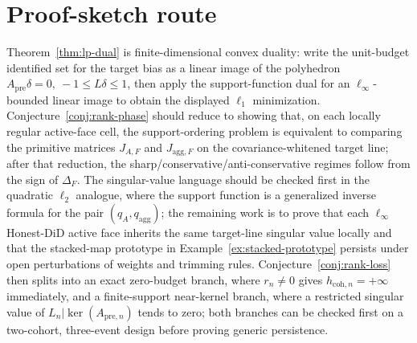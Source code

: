 \documentclass[11pt]{article}
\theoremstyle{definition}
\theoremstyle{plain}
\theoremstyle{remark}
\begin{document}
\section{Proof-sketch route}
Theorem~\ref{thm:lp-dual} is finite-dimensional convex duality: write the unit-budget identified set for the target bias as a linear image of the polyhedron \(A_{\mathrm{pre}}\delta=0,\ -1\le L\delta\le1\), then apply the support-function dual for an \(\ell_\infty\)-bounded linear image to obtain the displayed \(\ell_1\) minimization.
Conjecture~\ref{conj:rank-phase} should reduce to showing that, on each locally regular active-face cell, the support-ordering problem is equivalent to comparing the primitive matrices \(J_{A,F}\) and \(J_{\mathrm{agg},F}\) on the covariance-whitened target line; after that reduction, the sharp/conservative/anti-conservative regimes follow from the sign of \(\Delta_F\).
The singular-value language should be checked first in the quadratic \(\ell_2\) analogue, where the support function is a generalized inverse formula for the pair \((q_A,q_{\mathrm{agg}})\); the remaining work is to prove that each \(\ell_\infty\) Honest-DiD active face inherits the same target-line singular value locally and that the stacked-map prototype in Example~\ref{ex:stacked-prototype} persists under open perturbations of weights and trimming rules.
Conjecture~\ref{conj:rank-loss} then splits into an exact zero-budget branch, where \(r_n\ne0\) gives \(h_{\mathrm{coh},n}=+\infty\) immediately, and a finite-support near-kernel branch, where a restricted singular value of \(L_n|\ker(A_{\mathrm{pre},n})\) tends to zero; both branches can be checked first on a two-cohort, three-event design before proving generic persistence.
\end{document}
